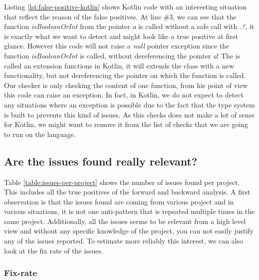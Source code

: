 \begin{enumerate}
	Listing \ref{lst:false-positive-kotlin} shows Kotlin code with an interesting situation that reflect the reason of the false positives. 
	At line $\#3$, we can see that the function \emph{isBooleanOrInt} from the pointer \emph{a} is called without a safe call with \emph{.?}, it is exactly what we want to detect and might look like a true positive at first glance. 
	However this code will not raise a \emph{null} pointer exception since the function \emph{isBooleanOrInt} is called, without dereferencing the pointer \emph{a}! 
	The is called an extension functions \cite{kotlinExtensionFun:2019:Online} in Kotlin, it will extends the class with a new functionality, but not dereferencing the pointer on which the function is called.
	Our checker is only checking the content of one function, from his point of view this code can raise an exception. 
	In fact, in Kotlin, we do not expect to detect any situations where an exception is possible due to the fact that the type system is built to prevents this kind of issues.
	As this checks does not make a lot of sense for Kotlin, we might want to remove it from the list of checks that we are going to run on the language.
\end{enumerate}

\subsection{Are the issues found really relevant?}
\label{subsec:are_the_issues_relevant}

Table \ref{table:issues-per-project} shows the number of issues found per project. 
This includes all the true positives of the forward and backward analysis. 
A first observation is that the issues found are coming from various project and in various situations, it is not one anti-pattern that is repeated multiple times in the same project. Additionally, all the issues seems to be relevant from a high level view and without any specific knowledge of the project, you can not easily justify any of the issues reported. 
To estimate more reliably this interest, we can also look at the fix rate of the issues.

\subsubsection{Fix-rate}
\label{subsubsec:fix_rate}

